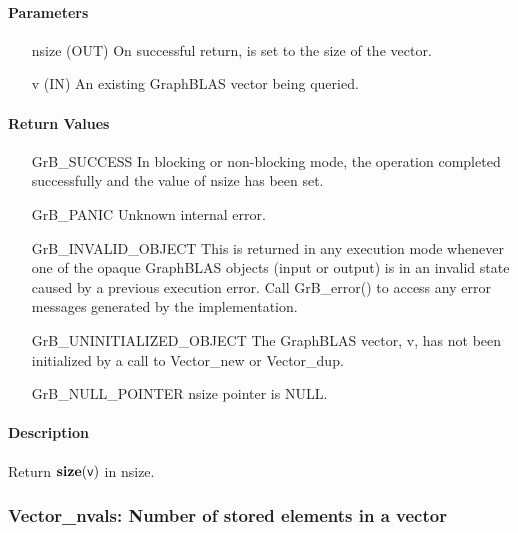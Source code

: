 \paragraph{Parameters}

\begin{itemize}[leftmargin=1.1in]
    \item[{\sf nsize}] ({\sf OUT}) On successful return, is set to the size 
                                   of the vector.
    \item[{\sf v}]     ({\sf IN})  An existing GraphBLAS vector being queried.
\end{itemize}

\paragraph{Return Values}

\begin{itemize}[leftmargin=2.1in]
    \item[{\sf GrB\_SUCCESS}]   In blocking or non-blocking mode, the operation 
    completed successfully and the value of {\sf nsize} has been set.

    \item[{\sf GrB\_PANIC}]     Unknown internal error.
    
    \item[{\sf GrB\_INVALID\_OBJECT}] This is returned in any execution mode 
    whenever one of the opaque GraphBLAS objects (input or output) is in an invalid 
    state caused by a previous execution error.  Call {\sf GrB\_error()} to access 
    any error messages generated by the implementation.

    \item[{\sf GrB\_UNINITIALIZED\_OBJECT}]  The GraphBLAS vector, {\sf v}, has 
    not been initialized by a call to {\sf Vector\_new} or {\sf Vector\_dup}.
    
    \item[{\sf GrB\_NULL\_POINTER}]  {\sf nsize} pointer is {\sf NULL}.
\end{itemize}

\paragraph{Description}

Return $\mathbf{size}({\sf v})$ in {\sf nsize}.

\subsubsection{{\sf Vector\_nvals}: Number of stored elements in a vector}
\label{Sec:Vector_nvals}

